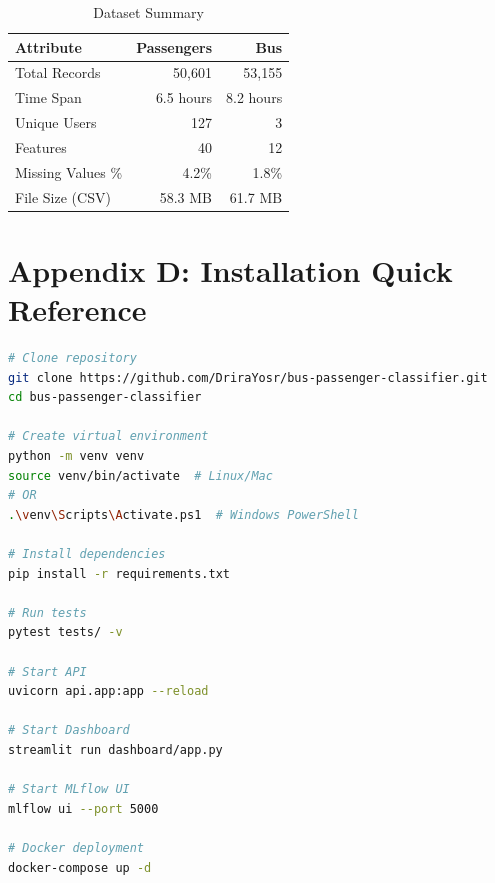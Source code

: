 \begin{table}[h]
\centering
\caption{Dataset Summary}
\begin{tabular}{lrr}
\toprule
\textbf{Attribute} & \textbf{Passengers} & \textbf{Bus} \\
\midrule
Total Records & 50,601 & 53,155 \\
Time Span & 6.5 hours & 8.2 hours \\
Unique Users & 127 & 3 \\
Features & 40 & 12 \\
Missing Values \% & 4.2\% & 1.8\% \\
File Size (CSV) & 58.3 MB & 61.7 MB \\
\bottomrule
\end{tabular}
\end{table}

\section*{Appendix D: Installation Quick Reference}

\begin{lstlisting}[language=bash, caption=Quick Start Commands]
# Clone repository
git clone https://github.com/DriraYosr/bus-passenger-classifier.git
cd bus-passenger-classifier

# Create virtual environment
python -m venv venv
source venv/bin/activate  # Linux/Mac
# OR
.\venv\Scripts\Activate.ps1  # Windows PowerShell

# Install dependencies
pip install -r requirements.txt

# Run tests
pytest tests/ -v

# Start API
uvicorn api.app:app --reload

# Start Dashboard
streamlit run dashboard/app.py

# Start MLflow UI
mlflow ui --port 5000

# Docker deployment
docker-compose up -d
\end{lstlisting}
